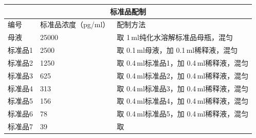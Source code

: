 \documentclass[UTF8,10pt,a4paper,fontset=fandol]{ctexart}
\newcommand{\fieldvalue}[1]{#1}
\newcommand{\handwritten}[1]{#1}
\begin{document}
\begin{center}
\begin{tabular}{|p{2.3cm}|p{3.0cm}|p{8.0cm}|}
\hline
\multicolumn{3}{|c|}{标准品配制} \\ \hline
编号 & 标准品浓度（pg/ml） & 配制方法 \\ \hline
母液 & 25000 &
取
\fieldvalue{\handwritten{1}}\,ml纯化水溶解标准品母瓶，混匀
\\ \hline
标准品1 & 2500 &
取
\fieldvalue{\handwritten{0.1}}\,ml母液，加
\fieldvalue{\handwritten{0.1}}\,ml稀释液，混匀
\\ \hline
标准品2 & 1250 &
取
\fieldvalue{\handwritten{0.4}}\,ml标准品1，加
\fieldvalue{\handwritten{0.4}}\,ml稀释液，混匀
\\ \hline
标准品3 & 625 &
取
\fieldvalue{\handwritten{0.4}}\,ml标准品2，加
\fieldvalue{\handwritten{0.4}}\,ml稀释液，混匀
\\ \hline
标准品4 & 313 &
取
\fieldvalue{\handwritten{0.4}}\,ml标准品3，加
\fieldvalue{\handwritten{0.4}}\,ml稀释液，混匀
\\ \hline
标准品5 & 156 &
取
\fieldvalue{\handwritten{0.4}}\,ml标准品4，加
\fieldvalue{\handwritten{0.4}}\,ml稀释液，混匀
\\ \hline
标准品6 & 78 &
取
\fieldvalue{\handwritten{0.4}}\,ml标准品5，加
\fieldvalue{\handwritten{0.4}}\,ml稀释液，混匀
\\ \hline
标准品7 & 39 &
取

\end{tabular}
\end{center}
\end{document}
